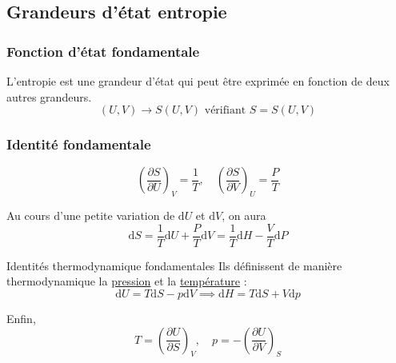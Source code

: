 
\label{sec:Fonction d'état entropie}


\subsection{Grandeurs d'état entropie} %
\label{sub:Grandeurs d'état entropie}


\subsubsection{Fonction d'état fondamentale} %
\label{sec:Fonction d'état fondamentale}

L'entropie est une grandeur d'état qui peut être exprimée en fonction de deux autres grandeurs. 
\begin{equation}
  (U, V) \to S(U,V) \text{ vérifiant } S = S(U,V)
\end{equation}


\subsubsection{Identité fondamentale} %
\label{sec:Identité fondamentale}

\begin{equation}
  \left( \frac{\partial S}{\partial U}  \right)_V = \frac{1}{T} , \quad 
  \left( \frac{\partial S}{\partial V}  \right)_U = \frac{P}{T} 
\end{equation}

Au cours d'une petite variation de $\mathrm{d}U$ et $\mathrm{d}V$, on aura 
\begin{equation}
  \mathrm{d}S = \frac{1}{T}  \mathrm{d}U + \frac{P}{T}  \mathrm{d}V = \frac{1}{T}  \mathrm{d}H - \frac{V}{T}  \mathrm{d}P
\end{equation}

\begin{Theorem}{Identités thermodynamique fondamentales}{}
Ils définissent de manière thermodynamique la \underline{pression} et la \underline{température} : 
\begin{equation}
  \boxed{\mathrm{d}U = T \mathrm{d}S - p \mathrm{d} V \implies \mathrm{d}H = T \mathrm{d} S + V \mathrm{d}p}
\end{equation}

Enfin, 
\begin{equation}
  T = \left( \frac{\partial U}{\partial S}  \right)_V, \quad p = -\left(  \frac{\partial U}{\partial V}  \right)_S
\end{equation}
\end{Theorem}

